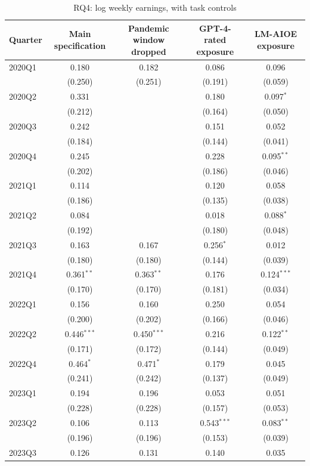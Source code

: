 \begin{table}[htbp]\centering
\caption{RQ4: log weekly earnings, with task controls}
\begin{tabular}{lcccc}
\toprule
Quarter & Main specification & Pandemic window dropped & GPT-4-rated exposure & LM-AIOE exposure \\
\midrule
2020Q1 & 0.180 & 0.182 & 0.086 & 0.096 \\
 & (0.250) & (0.251) & (0.191) & (0.059) \\
2020Q2 & 0.331 &  & 0.180 & 0.097$^{*}$ \\
 & (0.212) &  & (0.164) & (0.050) \\
2020Q3 & 0.242 &  & 0.151 & 0.052 \\
 & (0.184) &  & (0.144) & (0.041) \\
2020Q4 & 0.245 &  & 0.228 & 0.095$^{**}$ \\
 & (0.202) &  & (0.186) & (0.046) \\
2021Q1 & 0.114 &  & 0.120 & 0.058 \\
 & (0.186) &  & (0.135) & (0.038) \\
2021Q2 & 0.084 &  & 0.018 & 0.088$^{*}$ \\
 & (0.192) &  & (0.180) & (0.048) \\
2021Q3 & 0.163 & 0.167 & 0.256$^{*}$ & 0.012 \\
 & (0.180) & (0.180) & (0.144) & (0.039) \\
2021Q4 & 0.361$^{**}$ & 0.363$^{**}$ & 0.176 & 0.124$^{***}$ \\
 & (0.170) & (0.170) & (0.181) & (0.034) \\
2022Q1 & 0.156 & 0.160 & 0.250 & 0.054 \\
 & (0.200) & (0.202) & (0.166) & (0.046) \\
2022Q2 & 0.446$^{***}$ & 0.450$^{***}$ & 0.216 & 0.122$^{**}$ \\
 & (0.171) & (0.172) & (0.144) & (0.049) \\
2022Q4 & 0.464$^{*}$ & 0.471$^{*}$ & 0.179 & 0.045 \\
 & (0.241) & (0.242) & (0.137) & (0.049) \\
2023Q1 & 0.194 & 0.196 & 0.053 & 0.051 \\
 & (0.228) & (0.228) & (0.157) & (0.053) \\
2023Q2 & 0.106 & 0.113 & 0.543$^{***}$ & 0.083$^{**}$ \\
 & (0.196) & (0.196) & (0.153) & (0.039) \\
2023Q3 & 0.126 & 0.131 & 0.140 & 0.035 \\

\end{tabular}
\end{table}
